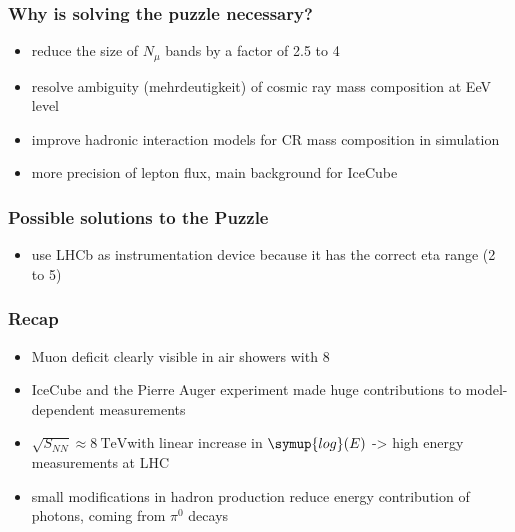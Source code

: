 \documentclass[aspectratio=1610, 9pt]{beamer}
\begin{document}

\begin{frame}\frametitle{Why is solving the puzzle necessary?}
  \begin{itemize}
    \item reduce the size of $N_\mu$ bands by a factor of 2.5 to 4
    \item resolve ambiguity (mehrdeutigkeit) of cosmic ray mass composition at EeV level
    \item improve hadronic interaction models for CR mass composition in simulation
    \item more precision of lepton flux, main background for IceCube
  \end{itemize}
\end{frame}

\begin{frame}\frametitle{Possible solutions to the Puzzle}
  \begin{itemize}
    \item use LHCb as instrumentation device because it has the correct eta range (2 to 5)
  \end{itemize}
\end{frame}

\begin{frame}\frametitle{Recap}
  \begin{itemize}
    \item Muon deficit clearly visible in air showers with 8\sigma
    \item IceCube and the Pierre Auger experiment made huge contributions to model-dependent measurements
    \item $\sqrt{S_{NN}} \approx \SI{8}{\tera\electronvolt}$with linear increase in $\symup{log}(E)$ -> high energy measurements at LHC
    \item small modifications in hadron production reduce energy contribution of photons, coming from $\pi^{0}$ decays
  \end{itemize}
\end{frame}
\end{document}
